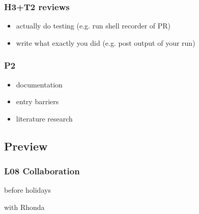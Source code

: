 \begin{frame}
	\frametitle{H3+T2 reviews}

	\begin{itemize}
	\item actually do testing (e.g. run shell recorder of PR)
	\item write what exactly you did (e.g. post output of your run)
	\end{itemize}
\end{frame}

\begin{frame}
	\frametitle{P2}

	\begin{itemize}
	\item documentation
	\item entry barriers
	\item literature research
	\end{itemize}
\end{frame}

%

\subsection{Preview}

\begin{frame}
	\frametitle{L08 Collaboration}

	before holidays

	with Rhonda
\end{frame}


\appendix

\begin{frame}[allowframebreaks]
	
	
\end{frame}




